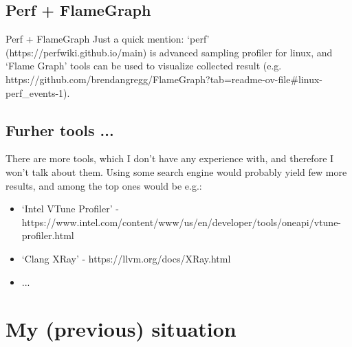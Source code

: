 \documentclass[aspectratio=169]{beamer}
\begin{document}
\subsection{Perf + FlameGraph}

\begin{frame}{Perf + FlameGraph}
    Just a quick mention: `perf' (https://perfwiki.github.io/main) is advanced sampling profiler for linux, and `Flame Graph' tools can be used to visualize collected result (e.g. https://github.com/brendangregg/FlameGraph?tab=readme-ov-file\#linux-perf\_events-1).

\end{frame}


\subsection{Furher tools ...}

\begin{frame}
    There are more tools, which I don't have any experience with, and therefore I won't talk about them. Using some search engine would probably yield few more results, and among the top ones would be e.g.:

    \begin{itemize}
        \item `Intel VTune Profiler' - https://www.intel.com/content/www/us/en/developer/tools/oneapi/vtune-profiler.html
        \item `Clang XRay' - https://llvm.org/docs/XRay.html
        \item ...
    \end{itemize}

\end{frame}



\section{My (previous) situation}
\end{document}
